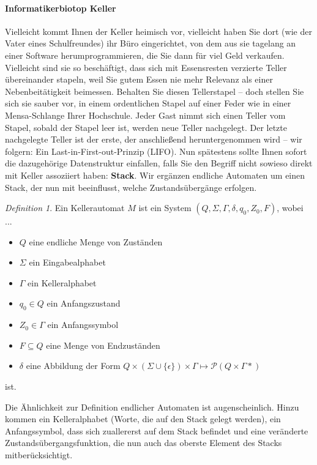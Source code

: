 \documentclass[11pt,a4paper]{scrreport}
\theoremstyle{remark}
\theoremstyle{custom}
\newtheorem{definition}{Definition}[section]
\begin{document}
\paragraph{Informatikerbiotop Keller} Vielleicht kommt Ihnen der Keller heimisch vor, vielleicht haben Sie dort (wie der Vater eines Schulfreundes) ihr Büro eingerichtet, von dem aus sie tagelang an einer Software herumprogrammieren, die Sie dann für viel Geld verkaufen. Vielleicht sind sie so beschäftigt, dass sich mit Essensresten verzierte Teller übereinander stapeln, weil Sie gutem Essen nie mehr Relevanz als einer Nebenbeitätigkeit beimessen. Behalten Sie diesen Tellerstapel -- doch stellen Sie sich sie sauber vor, in einem ordentlichen Stapel auf einer Feder wie in einer Mensa-Schlange Ihrer Hochschule. Jeder Gast nimmt sich einen Teller vom Stapel, sobald der Stapel leer ist, werden neue Teller nachgelegt. Der letzte nachgelegte Teller ist der erste, der anschließend heruntergenommen wird -- wir folgern: Ein Last-in-First-out-Prinzip (LIFO). Nun spätestens sollte Ihnen sofort die dazugehörige Datenstruktur einfallen, falls Sie den Begriff nicht sowieso direkt mit {\glqq}Keller{\grqq} assoziiert haben: \textbf{Stack}.
Wir ergänzen endliche Automaten um einen Stack, der nun mit beeinflusst, welche Zustandsübergänge erfolgen.
\begin{definition}
Ein Kellerautomat $M$ ist ein System $(Q, \Sigma, \Gamma, \delta, q_0, Z_0, F)$, wobei ...
\begin{itemize}
\item $Q$ eine endliche Menge von Zuständen
\item $\Sigma$ ein Eingabealphabet
\item $\Gamma$ ein Kelleralphabet
\item $q_0 \in Q$ ein Anfangszustand
\item $Z_0 \in \Gamma$ ein Anfangssymbol
\item $F \subseteq Q$ eine Menge von Endzuständen
\item $\delta$ eine Abbildung der Form $Q \times (\Sigma \cup \lbrace \epsilon \rbrace) \times \Gamma \mapsto \mathcal{P}(Q \times \Gamma*)$
\end{itemize}
ist.
\end{definition}
Die Ähnlichkeit zur Definition endlicher Automaten ist augenscheinlich. Hinzu kommen ein Kelleralphabet (Worte, die auf den Stack gelegt werden), ein Anfangssymbol, dass sich zuallererst auf dem Stack befindet und eine veränderte Zustandsübergangsfunktion, die nun auch das oberste Element des Stacks mitberücksichtigt. 
\end{document}
